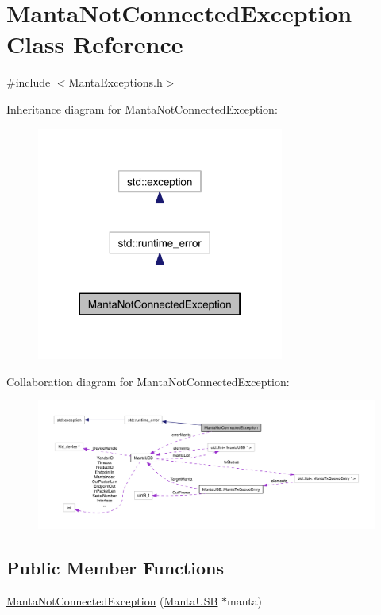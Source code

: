 \hypertarget{classMantaNotConnectedException}{\section{\-Manta\-Not\-Connected\-Exception \-Class \-Reference}
\label{classMantaNotConnectedException}
}


{\ttfamily \#include $<$\-Manta\-Exceptions.\-h$>$}



\-Inheritance diagram for \-Manta\-Not\-Connected\-Exception\-:\nopagebreak
\begin{figure}[H]
\begin{center}
\leavevmode
\includegraphics[width=230pt]{classMantaNotConnectedException__inherit__graph}
\end{center}
\end{figure}


\-Collaboration diagram for \-Manta\-Not\-Connected\-Exception\-:\nopagebreak
\begin{figure}[H]
\begin{center}
\leavevmode
\includegraphics[width=350pt]{classMantaNotConnectedException__coll__graph}
\end{center}
\end{figure}
\subsection*{\-Public \-Member \-Functions}
\begin{DoxyCompactItemize}
\item 
\hyperlink{classMantaNotConnectedException_ac85547e0ed5c4a7be0a9d95d1ffbc293}{\-Manta\-Not\-Connected\-Exception} (\hyperlink{classMantaUSB}{\-Manta\-U\-S\-B} $\ast$manta)
\end{DoxyCompactItemize}
